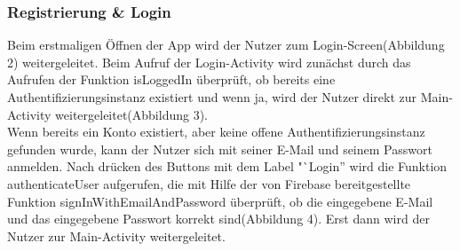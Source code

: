 \documentclass[12pt, a4paper, oneside]{article}
\begin{document}
\subsubsection{Registrierung \& Login}
Beim erstmaligen Öffnen der App wird der Nutzer zum Login-Screen(Abbildung 2) weitergeleitet.  Beim Aufruf der Login-Activity wird zunächst durch das Aufrufen der Funktion isLoggedIn überprüft, ob bereits eine Authentifizierungsinstanz existiert und wenn ja, wird der Nutzer direkt zur Main-Activity weitergeleitet(Abbildung 3).\\

Wenn bereits ein Konto existiert, aber keine offene Authentifizierungsinstanz gefunden wurde, kann der Nutzer sich mit seiner E-Mail und seinem Passwort anmelden. Nach drücken des Buttons mit dem Label "`Login'' wird die Funktion authenticateUser aufgerufen, die mit Hilfe der von Firebase bereitgestellte Funktion signInWithEmailAndPassword überprüft, ob die eingegebene E-Mail und das eingegebene Passwort korrekt sind(Abbildung 4). Erst dann wird der Nutzer zur Main-Activity weitergeleitet.\\ 
\end{document}
